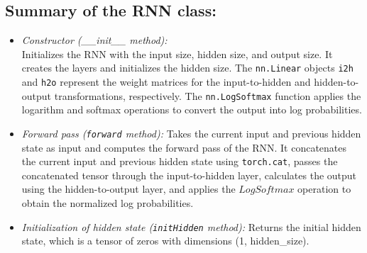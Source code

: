 \subsection*{Summary of the RNN class:}

\begin{itemize}
    \item \textit{Constructor (\_\_init\_\_ method):} \\ Initializes the RNN with the input size, hidden size, and output size. It creates the layers and initializes the hidden size. The \texttt{nn.Linear} objects \texttt{i2h} and \texttt{h2o} represent the weight matrices for the input-to-hidden and hidden-to-output transformations, respectively. The \texttt{nn.LogSoftmax} function applies the logarithm and softmax operations to convert the output into log probabilities.
    \item \textit{Forward pass (\texttt{forward} method):} Takes the current input and previous hidden state as input and computes the forward pass of the RNN. It concatenates the current input and previous hidden state using \texttt{torch.cat}, passes the concatenated tensor through the input-to-hidden layer, calculates the output using the hidden-to-output layer, and applies the $LogSoftmax$ operation to obtain the normalized log probabilities.
    \item \textit{Initialization of hidden state (\texttt{initHidden} method):} Returns the initial hidden state, which is a tensor of zeros with dimensions (1, hidden\_size).
\end{itemize}







